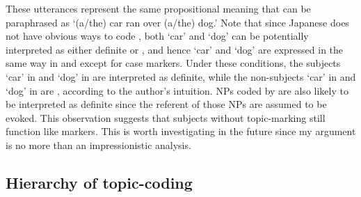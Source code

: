 These utterances represent the same propositional meaning
that can be paraphrased as `(a/the) car ran over (a/the) dog.'
Note that
since Japanese does not have obvious ways to code ,
both `car' and `dog' can be potentially interpreted as either definite or ,
and hence `car' and `dog' are expressed in the same way in \LLast and \Last
except for case markers.
Under these conditions,
the subjects `car' in \LLast and `dog' in \Last are interpreted as definite, %
while the non-subjects `car' in \Last and `dog' in \LLast are ,
according to the author's intuition.
NPs coded by  are also likely to be interpreted as definite since
the referent of those NPs are assumed to be evoked.
This observation suggests that subjects without topic-marking still function like  markers.
This is worth investigating in the future
since my argument is no more than an impressionistic analysis.


%


\subsection{Hierarchy of topic-coding}\label{Par:ArgStr:TopHierarchy}

